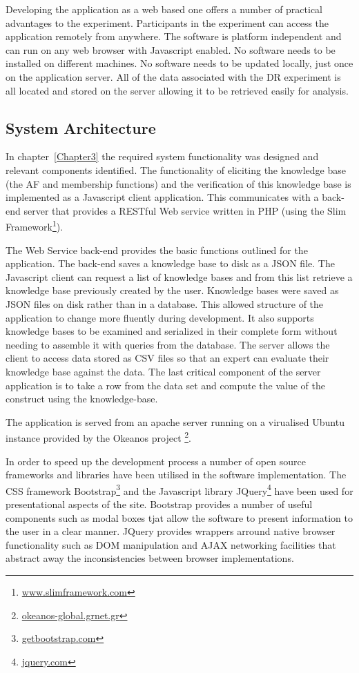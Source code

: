 Developing the application as a web based one offers a number of practical advantages to the experiment. Participants in the experiment can access the application remotely from anywhere. The software is platform independent and can run on any web browser with Javascript enabled. No software needs to be installed on different machines. No software needs to be updated locally, just once on the application server. All of the data associated with the DR experiment is all located and stored on the server allowing it to be retrieved easily for analysis.

\subsection{System Architecture}

In chapter~\ref{Chapter3} the required system functionality was designed and relevant components identified. The functionality of eliciting the knowledge base (the AF and membership functions) and the verification of this knowledge base is implemented as a Javascript client application. This communicates with a back-end server that provides a RESTful Web service written in PHP (using the Slim Framework\footnote{\url{www.slimframework.com}}).

The Web Service back-end provides the basic functions outlined for the application. The back-end saves a knowledge base to disk as a JSON file. The Javascript client can request a  list of knowledge bases and from this list retrieve a knowledge base previously created by the user. Knowledge bases were saved as JSON files on disk rather than in a database. This allowed structure of the application to change more fluently during development. It also supports knowledge bases to be examined and serialized in their complete form without needing to assemble it with queries from the database. The server allows the client to access data stored as CSV files so that an expert can evaluate their knowledge base against the data. 
The last critical component of the server application is to take a row from the data set and compute the value of the construct using the knowledge-base.

The application is served from an apache server running on a virualised Ubuntu instance provided by the Okeanos project \footnote{\url{okeanos-global.grnet.gr}}.

In order to speed up the development process a number of open source frameworks and libraries have been utilised in the software implementation. The CSS framework Bootstrap\footnote{\url{getbootstrap.com}} and the Javascript library JQuery\footnote{\url{jquery.com}} have been used for presentational aspects of the site. Bootstrap provides a number of useful components such as modal boxes tjat allow the software to present information to the user in a clear manner. JQuery provides wrappers arround native browser functionality such as DOM manipulation and AJAX networking facilities that abstract away the inconsistencies between browser implementations.

